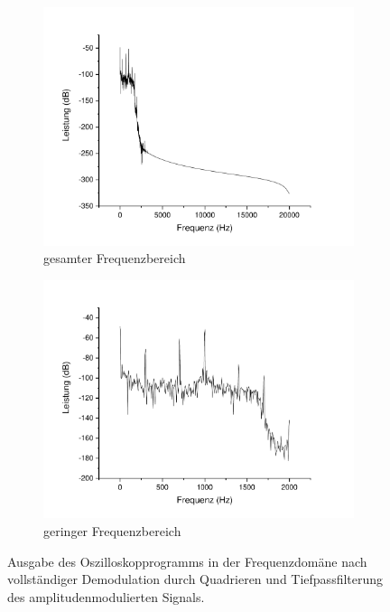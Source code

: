\documentclass[
a4paper,
12pt,
pagesize,
ngerman
]{scrartcl}
\begin{document}
	\begin{figure}[H] %
		\centering
		\begin{subfigure}[t]{0.5\textwidth}
			\centering
			\includegraphics[width=1\textwidth]{Origin-Files/AM-Demod-Quadrat-demod}
			\caption{gesamter Frequenzbereich}
		\end{subfigure}%
		\begin{subfigure}[t]{0.5\textwidth}
			\centering
			\includegraphics[width=1\textwidth]{Origin-Files/AM-Demod-Quadrat-demod-Bereich}
			\caption{geringer Frequenzbereich}
		\end{subfigure}
		\label{fig_tag3_am_demod_quadrat_vollst}
		\caption{Ausgabe des Oszilloskopprogramms in der Frequenzdomäne nach vollständiger Demodulation durch Quadrieren und Tiefpassfilterung des amplitudenmodulierten Signals.}
		\centering
	\end{figure}
\end{document}
